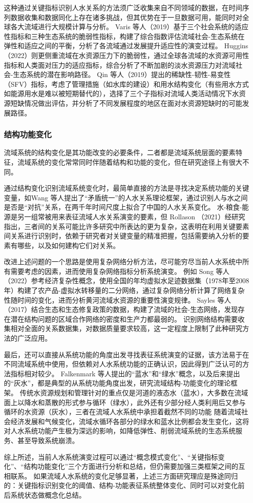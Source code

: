 这种通过关键指标识别人水关系的方法须广泛收集来自不同领域的数据，在时间序列数据收集和数据同化上存在诸多挑战，但其优势在于一旦数据可用，能同时对全球各大流域进行大规模计算与分析。
Varis 等人（2019）基于三个社会系统的适应性指标和三种生态系统的脆弱性指标，构建了综合指数评估流域社会-生态系统在弹性和适应之间的平衡，分析了各流域通过发展提升适应性的演变过程\cite{varis2019}。
Huggins（2022）则更侧重流域在水资源压力下的脆弱性，通过全球各流域的水资源可用性指标和人类面对压力的适应指标，综合分析了不断加剧的淡水资源压力对流域社会-生态系统的潜在影响路径\cite{huggins2022}。
Qin 等人（2019）提出的稀缺性-韧性-易变性（SFV）指标，考虑了管理措施（如水库的建设）和用水结构变化（有些用水方式如能源用水是难以被短期替代的），选择了三个子指标对流域人类活动情况下水资源短缺情况做出评估，并分析了不同发展程度的地区在面对水资源短缺时的可能发展路径\cite{qin2019}。

\subsubsection*{结构功能变化}

流域系统的结构变化是其功能改变的必要条件，二者都是流域系统层面的要素特征，流域系统的变化常常同时伴随着结构和功能的变化，但在研究途径上有很大不同。

通过结构变化识别流域系统变化时，最简单直接的方法是寻找决定系统功能的关键变量，如Wang 等人提出了“矛盾统一”的人水关系理论框架，通过识别人与水之间是否是“对抗”关系，在两千年时间尺度上拟合了中国的人水关系变化\cite{wang2017}。
水-粮食-能源是另一组常被用来表征流域人水关系演变的要素，但 Rollason （2021）经研究指出，三者间的关系可能比许多研究中所表达的更为复杂\cite{rollason2021}，这表明在利用关键要素间关系进行识别时，依赖于研究者对关键变量的精准把握，包括需要纳入分析的要素有哪些，以及如何建构它们对关系。 %

改进上述问题的一个思路是使用复杂网络分析方法，尽可能穷尽当前人水系统中所有需要考虑的因素，进而使用复杂网络指标分析系统演变。 %
例如 Song 等人（2022）参考经济复杂性概念，使用全国的年均虚拟水足迹数据集（1978年至2008年）构建了农产品-虚拟水转移量的二分网络，通过复杂网络分析计算了网络复杂性随时间的变化，进而分析黄河流域水资源的重要性演变规律\cite{song2022}。
Sayles 等人（2017）结合生态和生态修复政策的数据，构建了流域的社会-生态网络，发现存在潜在结构问题的区域合作网络的密度和生产力都最弱的\cite{sayles2017}。
识别网络结构需要收集相对全面的关系数据集，对数据质量要求较高，这一定程度上限制了此种研究方法的广泛应用。

最后，还可以直接从系统功能的角度出发寻找表征系统演变的证据，该方法易于在不同流域系统中使用，但依赖对人水系统功能的正确认识，因此得到广泛认可的方法指标相对较少。
Falkenmark 等人提出的“蓝水”和“绿水”概念\cite{falkenmark2006}，以及后来提出的“灰水”，都是典型的从系统功能角度出发，研究流域结构-功能变化的理论框架。 %
传统水资源规划和管理针对的重点仅是河道的液态水（蓝水），大多数在流域面上以降水和蒸散的形式参与循环（绿水），此外还有少部分经人类利用后又参与循环的水资源（灰水），三者在流域人水系统中承担着截然不同的功能\cite{craswell2007}
随着流域社会经济发展和气候变化，流域水循环各部分的绿水和蓝水比例都会发生变化，这将对人水系统功能产生极为深远的影响，如降低弹性、削弱流域系统的生态系统服务、甚至导致系统崩溃\cite{falkenmark2019}。

综上所述，当前人水系统演变过程可以通过“概念模式变化”、“关键指标变化”、“结构功能变化”三个方面进行分析和总结，但仍需要加强三类框架之间的互相联系。
如果流域人水系统的变化足够显著，上述三方面研究理应是殊途同归的：关键指标识别变化的阈值、结构-功能表征系统整体变化、同时可以对变化前后系统状态做概念化总结。
